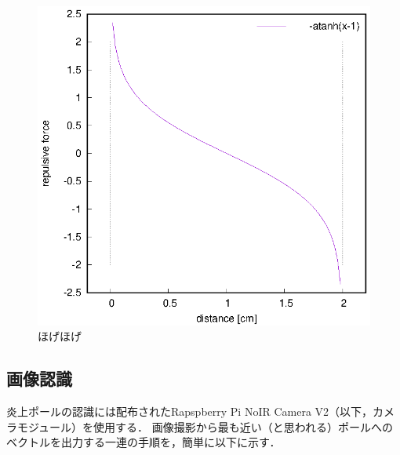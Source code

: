 \documentclass[11pt,a4paper]{jsarticle}
\begin{document}
  \begin{figure}[b]
    \begin{center}
      \includegraphics[width=1.0\hsize]{plot/minus_atanh.eps}
    \end{center}
    \caption{ほげほげ}
    \label{fig::atanh}
  \end{figure}

\subsection{画像認識}
  炎上ポールの認識には配布されたRapspberry Pi NoIR Camera V2（以下，カメラモジュール）を使用する．
  画像撮影から最も近い（と思われる）ポールへのベクトルを出力する一連の手順を，簡単に以下に示す．
\end{document}
